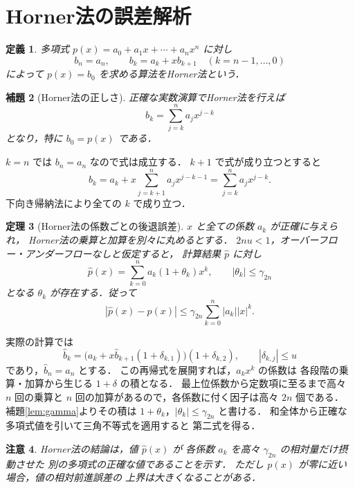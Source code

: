 \documentclass[a5paper,10pt,onecolumn]{jsarticle}
\makeatletter
\theoremstyle{mathnotetheorem}
\newtheorem{theorem}{定理}[section]
\newtheorem{definition}[theorem]{定義}
\newtheorem{lemma}[theorem]{補題}
\newtheorem{remark}[theorem]{注意}
\renewcommand{\proofname}{証明}
\renewenvironment{proof}[1][\proofname]{%
  \par\pushQED{\qed}\normalfont\topsep4\p@\@plus2\p@\relax
  \trivlist\item[\hskip\labelsep\bfseries #1]\ignorespaces
}{\popQED\endtrivlist\@endpefalse}
\makeatother
\begin{document}
\section{Horner法の誤差解析}
\begin{definition}
多項式 $p(x)=a_0+a_1x+\cdots+a_nx^n$ に対し
\[
 b_n=a_n,\qquad b_k=a_k+xb_{k+1}
 \quad(k=n-1,\ldots,0)
\]
によって $p(x)=b_0$ を求める算法をHorner法という．
\end{definition}
\begin{lemma}[Horner法の正しさ]
正確な実数演算でHorner法を行えば
\[
 b_k=\sum_{j=k}^n a_jx^{j-k}
\]
となり，特に $b_0=p(x)$ である．
\end{lemma}
\begin{proof}
$k=n$ では $b_n=a_n$ なので式は成立する．
$k+1$ で式が成り立つとすると
\[
 b_k=a_k+x\sum_{j=k+1}^n a_jx^{j-k-1}
 =\sum_{j=k}^na_jx^{j-k}.
\]
下向き帰納法により全ての $k$ で成り立つ．
\end{proof}
\begin{theorem}[Horner法の係数ごとの後退誤差]\label{thm:horner}
$x$ と全ての係数 $a_k$ が正確に与えられ，
Horner法の乗算と加算を別々に丸めるとする．
$2nu<1$，オーバーフロー・アンダーフローなしと仮定すると，
計算結果 $\widehat p$ に対し
\[
 \widehat p(x)=\sum_{k=0}^na_k(1+\theta_k)x^k,
 \qquad |\theta_k|\le\gamma_{2n}
\]
となる $\theta_k$ が存在する．従って
\[
 |\widehat p(x)-p(x)|
 \le\gamma_{2n}\sum_{k=0}^n|a_k||x|^k.
\]
\end{theorem}
\begin{proof}
実際の計算では
\[
 \widehat b_k=
 \bigl(a_k+x\widehat b_{k+1}(1+\delta_{k,1})\bigr)
 (1+\delta_{k,2}),\qquad
 |\delta_{k,j}|\le u
\]
であり，$\widehat b_n=a_n$ とする．
この再帰式を展開すれば，$a_kx^k$ の係数は
各段階の乗算・加算から生じる $1+\delta$ の積となる．
最上位係数から定数項に至るまで高々 $n$ 回の乗算と
$n$ 回の加算があるので，各係数に付く因子は高々 $2n$ 個である．
補題\ref{lem:gamma}よりその積は
$1+\theta_k$，$|\theta_k|\le\gamma_{2n}$ と書ける．
和全体から正確な多項式値を引いて三角不等式を適用すると
第二式を得る．
\end{proof}
\begin{remark}
Horner法の結論は，値 $\widehat p(x)$ が
各係数 $a_k$ を高々 $\gamma_{2n}$ の相対量だけ摂動させた
別の多項式の正確な値であることを示す．
ただし $p(x)$ が零に近い場合，値の相対前進誤差の
上界は大きくなることがある．
\end{remark}
\end{document}
